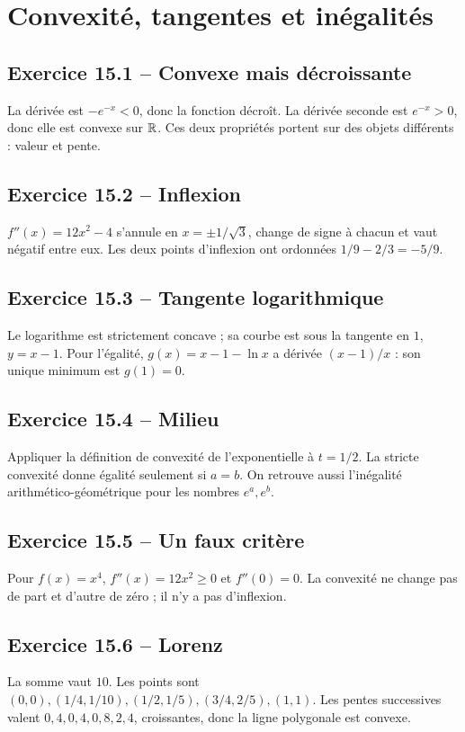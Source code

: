 \chapter{Convexité, tangentes et inégalités}
\section*{Exercice 15.1 -- Convexe mais décroissante}
La dérivée est $-e^{-x}<0$, donc la fonction décroît. La dérivée seconde est $e^{-x}>0$, donc elle est convexe sur $\mathbb{R}$. Ces deux propriétés portent sur des objets différents : valeur et pente.

\section*{Exercice 15.2 -- Inflexion}
$f''(x)=12x^2-4$ s'annule en $x=\pm1/\sqrt3$, change de signe à chacun et vaut négatif entre eux. Les deux points d'inflexion ont ordonnées $1/9-2/3=-5/9$.

\section*{Exercice 15.3 -- Tangente logarithmique}
Le logarithme est strictement concave ; sa courbe est sous la tangente en $1$, $y=x-1$. Pour l'égalité, $g(x)=x-1-\ln x$ a dérivée $(x-1)/x$ : son unique minimum est $g(1)=0$.

\section*{Exercice 15.4 -- Milieu}
Appliquer la définition de convexité de l'exponentielle à $t=1/2$. La stricte convexité donne égalité seulement si $a=b$. On retrouve aussi l'inégalité arithmético-géométrique pour les nombres $e^a,e^b$.

\section*{Exercice 15.5 -- Un faux critère}
Pour $f(x)=x^4$, $f''(x)=12x^2\ge0$ et $f''(0)=0$. La convexité ne change pas de part et d'autre de zéro ; il n'y a pas d'inflexion.

\section*{Exercice 15.6 -- Lorenz}
La somme vaut $10$. Les points sont $(0,0),(1/4,1/10),(1/2,1/5),(3/4,2/5),(1,1)$. Les pentes successives valent $0{,}4,0{,}4,0{,}8,2{,}4$, croissantes, donc la ligne polygonale est convexe.
